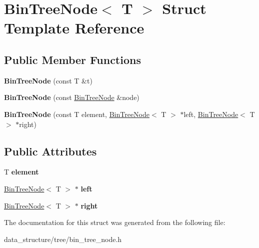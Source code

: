 \hypertarget{structBinTreeNode}{}\section{Bin\+Tree\+Node$<$ T $>$ Struct Template Reference}
\label{structBinTreeNode}
\subsection*{Public Member Functions}
\begin{DoxyCompactItemize}
\item 
\mbox{\label{structBinTreeNode_a183dfc81bb143bf6b4f0da7ca08711f7}} 
{\bfseries Bin\+Tree\+Node} (const T \&t)
\item 
\mbox{\label{structBinTreeNode_a04595d3785a8e8805faa221350403771}} 
{\bfseries Bin\+Tree\+Node} (const \hyperlink{structBinTreeNode}{Bin\+Tree\+Node} \&node)
\item 
\mbox{\label{structBinTreeNode_aa6fbf2ee8fc699213859d59a41d7eebd}} 
{\bfseries Bin\+Tree\+Node} (const T element, \hyperlink{structBinTreeNode}{Bin\+Tree\+Node}$<$ T $>$ $\ast$left, \hyperlink{structBinTreeNode}{Bin\+Tree\+Node}$<$ T $>$ $\ast$right)
\end{DoxyCompactItemize}
\subsection*{Public Attributes}
\begin{DoxyCompactItemize}
\item 
\mbox{\label{structBinTreeNode_a8ee4018deac9c4370af76d8e286623a2}} 
T {\bfseries element}
\item 
\mbox{\label{structBinTreeNode_ab7386d550c1c2f2177be65dc4bb092a0}} 
\hyperlink{structBinTreeNode}{Bin\+Tree\+Node}$<$ T $>$ $\ast$ {\bfseries left}
\item 
\mbox{\label{structBinTreeNode_a6150f9680ee766df7d189eb2549d3f48}} 
\hyperlink{structBinTreeNode}{Bin\+Tree\+Node}$<$ T $>$ $\ast$ {\bfseries right}
\end{DoxyCompactItemize}


The documentation for this struct was generated from the following file\+:\begin{DoxyCompactItemize}
\item 
data\+\_\+structure/tree/bin\+\_\+tree\+\_\+node.\+h\end{DoxyCompactItemize}
